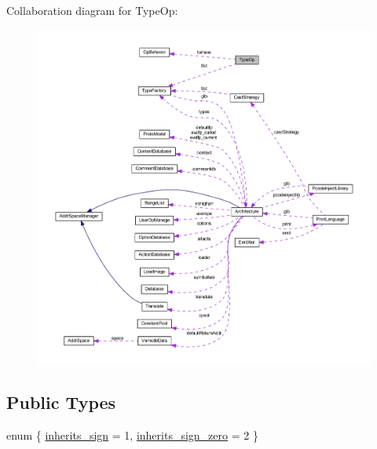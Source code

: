 Collaboration diagram for Type\+Op\+:
\nopagebreak
\begin{figure}[H]
\begin{center}
\leavevmode
\includegraphics[width=350pt]{class_type_op__coll__graph}
\end{center}
\end{figure}
\subsection*{Public Types}
\begin{DoxyCompactItemize}
\item 
enum \{ \mbox{\hyperlink{class_type_op_ae4453ff1926b197c1a6cc93de1afa2e2a56c5af99e9a3391410a24e704e65914a}{inherits\+\_\+sign}} = 1, 
\mbox{\hyperlink{class_type_op_ae4453ff1926b197c1a6cc93de1afa2e2ae19eeb20815c894d613cd03aa54047c1}{inherits\+\_\+sign\+\_\+zero}} = 2
 \}
\end{DoxyCompactItemize}
